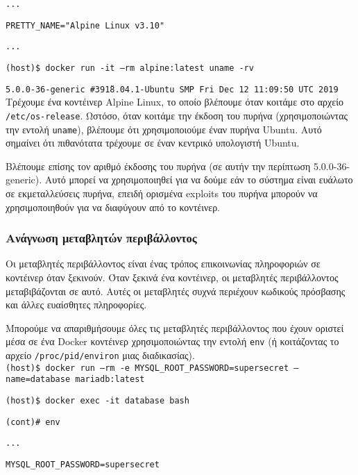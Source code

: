 \texttt{\textlatin{...}}

\texttt{\textlatin{PRETTY\_NAME="Alpine Linux v3.10"}}

\texttt{\textlatin{...}}

\texttt{\textlatin{(host)\$ docker run -it --rm alpine:latest uname -rv}}

\texttt{\textlatin{5.0.0-36-generic \#39\~18.04.1-Ubuntu SMP Fri Dec 12 11:09:50 UTC 2019}} \\


Τρέχουμε ένα κοντέινερ \textlatin{Alpine Linux}, το οποίο βλέπουμε όταν κοιτάμε
στο αρχείο \texttt{\textlatin{/etc/os-release}}. Ωστόσο, όταν κοιτάμε την έκδοση
του πυρήνα (χρησιμοποιώντας την εντολή \texttt{\textlatin{uname}}), βλέπουμε ότι
χρησιμοποιούμε έναν πυρήνα \textlatin{Ubuntu}. Αυτό σημαίνει ότι πιθανότατα
τρέχουμε σε έναν κεντρικό υπολογιστή \textlatin{Ubuntu}.

Βλέπουμε επίσης τον αριθμό έκδοσης του πυρήνα (σε αυτήν την περίπτωση
\textlatin{5.0.0-36-generic}). Αυτό μπορεί να χρησιμοποιηθεί για να δούμε εάν το
σύστημα είναι ευάλωτο σε εκμεταλλεύσεις πυρήνα, επειδή ορισμένα
\textlatin{exploits} του πυρήνα μπορούν να χρησιμοποιηθούν για να διαφύγουν από
το κοντέινερ.

\subsubsection{Ανάγνωση μεταβλητών περιβάλλοντος}

Οι μεταβλητές περιβάλλοντος είναι ένας τρόπος επικοινωνίας πληροφοριών σε
κοντέινερ όταν ξεκινούν. Όταν ξεκινά ένα κοντέινερ, οι μεταβλητές περιβάλλοντος
μεταβιβάζονται σε αυτό. Αυτές οι μεταβλητές συχνά περιέχουν κωδικούς πρόσβασης
και άλλες ευαίσθητες πληροφορίες.

Μπορούμε να απαριθμήσουμε όλες τις μεταβλητές περιβάλλοντος που έχουν οριστεί
μέσα σε ένα \textlatin{Docker} κοντέινερ χρησιμοποιώντας την εντολή
\texttt{\textlatin{env}} (ή κοιτάζοντας το αρχείο
\texttt{\textlatin{/proc/pid/environ}} μιας διαδικασίας).\\

\texttt{\textlatin{(host)\$ docker run --rm -e MYSQL\_ROOT\_PASSWORD=supersecret --name=database mariadb:latest}}

\texttt{\textlatin{(host)\$ docker exec -it database bash}}

\texttt{\textlatin{(cont)\# env}}

\texttt{\textlatin{...}}

\texttt{\textlatin{MYSQL\_ROOT\_PASSWORD=supersecret}}

